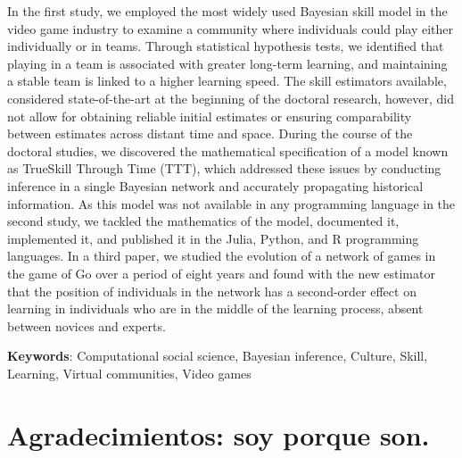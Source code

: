 \documentclass[a4paper,11pt]{book}
\theoremstyle{definition}
\begin{document}

In the first study, we employed the most widely used Bayesian skill model in the video game industry to examine a community where individuals could play either individually or in teams.
%
Through statistical hypothesis tests, we identified that playing in a team is associated with greater long-term learning, and maintaining a stable team is linked to a higher learning speed.
%
The skill estimators available, considered state-of-the-art at the beginning of the doctoral research, however, did not allow for obtaining reliable initial estimates or ensuring comparability between estimates across distant time and space.
%
During the course of the doctoral studies, we discovered the mathematical specification of a model known as TrueSkill Through Time (TTT), which addressed these issues by conducting inference in a single Bayesian network and accurately propagating historical information.
%
As this model was not available in any programming language in the second study, we tackled the mathematics of the model, documented it, implemented it, and published it in the Julia, Python, and R programming languages.
%
In a third paper, we studied the evolution of a network of games in the game of Go over a period of eight years and found with the new estimator that the position of individuals in the network has a second-order effect on learning in individuals who are in the middle of the learning process, absent between novices and experts.
%
\vspace{0.1cm}

\noindent \textbf{Keywords}: Computational social science, Bayesian inference, Culture, Skill, Learning, Virtual communities, Video games

\normalsize

\tableofcontents

\newpage

\vfill


\normalsize

\chapter*{Agradecimientos: soy porque son.}
\end{document}
